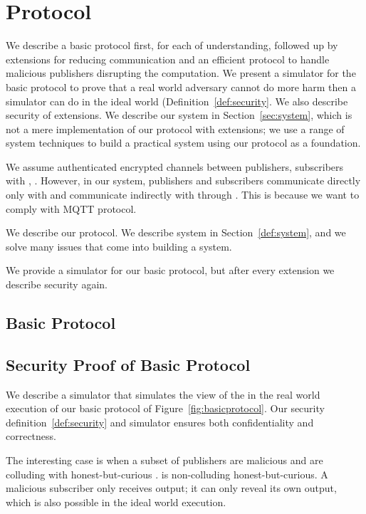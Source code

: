 \section{Protocol}
\label{sec:protocol}

We describe a basic protocol first, for each of understanding, followed up by
extensions for reducing communication and an efficient protocol to handle
malicious publishers disrupting the computation. We present a simulator for the
basic protocol to prove that a real world adversary cannot do more harm then a
simulator can do in the ideal world (Definition~\ref{def:security}. We also
describe security of extensions. We describe our system in
Section~\ref{sec:system}, which is not a mere implementation of our protocol
with extensions; we use a range of system techniques to build a practical
system using our protocol as a foundation. 

We assume authenticated encrypted channels between publishers, subscribers with
\broker, \garbler. However, in our system, publishers and subscribers
communicate directly only with \broker and communicate indirectly with \garbler
through \broker. This is because we want to comply with MQTT protocol.

We describe our protocol. We describe system in Section~\ref{def:system}, and
we solve many issues that come into building a system.

We provide a simulator for our basic protocol, but after every extension we
describe security again.


\subsection{Basic Protocol}


\subsection{Security Proof of Basic Protocol}
We describe a simulator \Sim that simulates the view of the \Adv in the real
world execution of our basic protocol of Figure~\ref{fig:basicprotocol}. Our
security definition~\ref{def:security} and simulator \Sim ensures both
confidentiality and correctness.

The interesting case is when a subset of publishers are malicious and are
colluding with honest-but-curious \broker. \garbler is non-colluding
honest-but-curious. A malicious subscriber only receives output; it can only
reveal its own output, which is also possible in the ideal world execution.\\[6pt]


